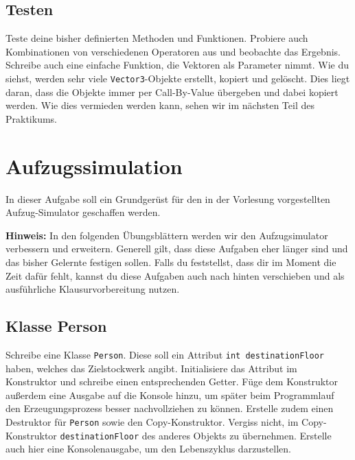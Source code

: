 \subsection{Testen}
Teste deine bisher definierten Methoden und Funktionen.
Probiere auch Kombinationen von verschiedenen Operatoren aus und beobachte das Ergebnis.
Schreibe auch eine einfache Funktion, die Vektoren als Parameter nimmt.
Wie du siehst, werden sehr viele \texttt{Vector3}-Objekte erstellt, kopiert und gelöscht.
Dies liegt daran, dass die Objekte immer per Call-By-Value übergeben und dabei kopiert werden.
Wie dies vermieden werden kann, sehen wir im nächsten Teil des Praktikums.



\newpage
\section{Aufzugssimulation}
In dieser Aufgabe soll ein Grundgerüst für den in der Vorlesung vorgestellten Aufzug-Simulator geschaffen werden.

\textbf{Hinweis:}
In den folgenden Übungsblättern werden wir den Aufzugsimulator verbessern und erweitern.
Generell gilt, dass diese Aufgaben eher länger sind und das bisher Gelernte festigen sollen.
Falls du feststellst, dass dir im Moment die Zeit dafür fehlt, kannst du diese Aufgaben auch nach hinten verschieben und als ausführliche Klausurvorbereitung nutzen.

\subsection{Klasse Person}
Schreibe eine Klasse \texttt{Person}.
Diese soll ein Attribut \texttt{int destinationFloor} haben, welches das Zielstockwerk angibt.
Initialisiere das Attribut im Konstruktor und schreibe einen entsprechenden Getter.
Füge dem Konstruktor außerdem eine Ausgabe auf die Konsole hinzu, um später beim Programmlauf den Erzeugungsprozess besser nachvollziehen zu können.
Erstelle zudem einen Destruktor für \texttt{Person} sowie den Copy-Konstruktor.
Vergiss nicht, im Copy-Konstruktor \texttt{destinationFloor} des anderes Objekts zu übernehmen.
Erstelle auch hier eine Konsolenausgabe, um den Lebenszyklus darzustellen.

